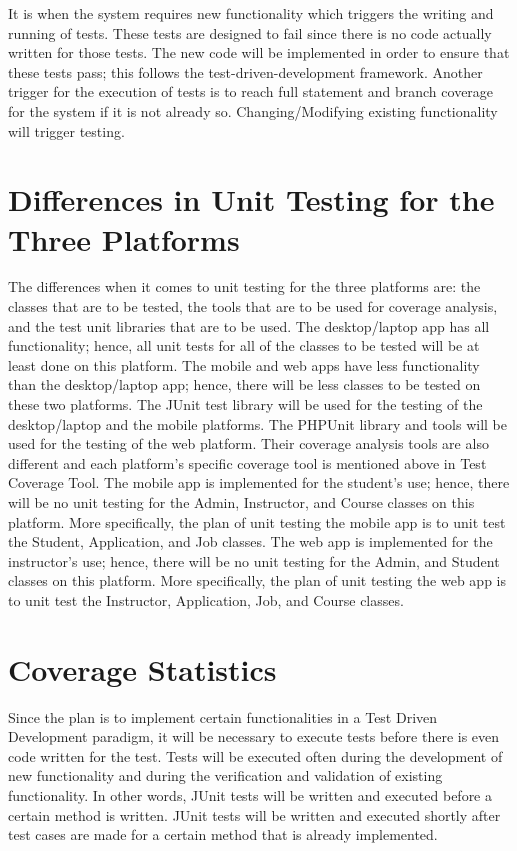 \documentclass[12pt]{report}
\begin{document}
    It is when the system requires new functionality which triggers the writing and running of tests. These tests are designed to fail since there is no code actually written for those tests. The new code will be implemented in order to ensure that these tests pass; this follows the test-driven-development framework. Another trigger for the execution of tests is to reach full statement and branch coverage for the system if it is not already so. Changing/Modifying existing functionality will trigger testing.
    
    \section{Differences in Unit Testing for the Three Platforms}
    
    The differences when it comes to unit testing for the three platforms are: the classes that
    are to be tested, the tools that are to be used for coverage analysis, and the test unit libraries that
    are to be used.
    The desktop/laptop app has all functionality; hence, all unit tests for all of the classes to be
    tested will be at least done on this platform. The mobile and web apps have less functionality
    than the desktop/laptop app; hence, there will be less classes to be tested on these two
    platforms. 
    The JUnit test library will be used for the testing of the desktop/laptop and the mobile platforms. The
    PHPUnit library and tools will be used for the testing of the web platform. Their coverage analysis tools are also
    different and each platform's specific coverage tool is mentioned above in Test Coverage Tool.
    The mobile app is implemented for the student's use; hence, there will be no
    unit testing for the Admin, Instructor, and Course classes on this platform. More specifically,
    the plan of unit testing the mobile app is to unit test the Student, Application, and Job
    classes. 
    The web app is implemented for the instructor's use; hence, there will be no unit testing for
    the Admin, and Student classes on this platform. More specifically, the plan of unit testing the
    web app is to unit test the Instructor, Application, Job, and Course classes.
    
    \section{Coverage Statistics}
    
    Since the plan is to implement certain functionalities in a Test Driven Development paradigm, it
    will be necessary to execute tests before there is even code written for the test. Tests will be
    executed often during the development of new functionality and during the verification and
    validation of existing functionality. In other words, JUnit tests will be written and executed
    before a certain method is written. JUnit tests will be written and executed shortly after test
    cases are made for a certain method that is already implemented. 
    
\end{document}
